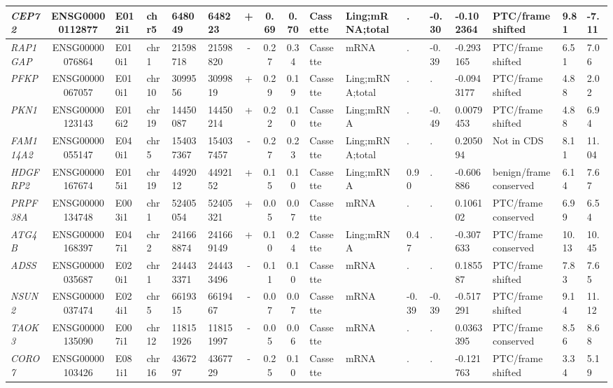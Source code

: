 \begin{appendices}
\begin{landscape}
\begin{table}
{\begin{tabular}{|l|c|l|l|l|l|c|c|c|l|l|l|l|l|l|l|l|}
\textit{CEP72} & ENSG00000112877 & E012i1 & chr5  & 648049 & 648223 & +     & 0.69  & 0.70  & Cassette & Ling;mRNA;total & . & -0.30 & -0.102364 & PTC/frame shifted & 9.81  &  -7.11 \\ \hline
\textit{RAP1GAP} & ENSG00000076864 & E010i1 & chr1  & 21598718 & 21598820 & -     & 0.27  & 0.34  & Cassette & mRNA  & . & -0.39 & -0.293165 & PTC/frame shifted & 6.51  &  7.06 \\ \hline
\textit{PFKP} & ENSG00000067057 & E010i1 & chr10 & 3099556 & 3099819 & +     & 0.29  & 0.19  & Cassette & Ling;mRNA;total & . & . & -0.0943177 & PTC/frame shifted & 4.88  &  2.02 \\ \hline
\textit{PKN1} & ENSG00000123143 & E016i2 & chr19 & 14450087 & 14450214 & +     & 0.22  & 0.10  & Cassette & Ling;mRNA & . & -0.49 & 0.0079453 & PTC/frame shifted & 4.88  &  6.94 \\ \hline
\textit{FAM114A2} & ENSG00000055147 & E040i1 & chr5  & 154037367 & 154037457 & -     & 0.27  & 0.23  & Cassette & Ling;mRNA;total & . & . & 0.205094 & Not in CDS & 8.11  &  11.04 \\ \hline
\textit{HDGFRP2} & ENSG00000167674 & E015i1 & chr19 & 4492012 & 4492152 & +     & 0.15  & 0.10  & Cassette & Ling;mRNA & 0.90  & . & -0.606886 & benign/frame conserved & 6.14  &  7.67 \\ \hline
\textit{PRPF38A} & ENSG00000134748 & E003i1 & chr1  & 52405054 & 52405321 & +     & 0.05  & 0.07  & Cassette & mRNA  & . & . & 0.106102 & PTC/frame conserved & 6.99  &  6.54 \\ \hline
\textit{ATG4B} & ENSG00000168397 & E047i1 & chr2  & 241668874 & 241669149 & +     & 0.10  & 0.24  & Cassette & Ling;mRNA & 0.47  & . & -0.307633 & PTC/frame conserved & 10.13 &  10.45 \\ \hline
\textit{ADSS} & ENSG00000035687 & E020i1 & chr1  & 244433371 & 244433496 & -     & 0.11  & 0.10  & Cassette & mRNA  & . & . & 0.185587 & PTC/frame shifted & 7.83  &  7.65 \\ \hline
\textit{NSUN2} & ENSG00000037474 & E024i1 & chr5  & 6619315 & 6619467 & -     & 0.07  & 0.07  & Cassette & mRNA  & -0.39 & -0.39 & -0.517291 & PTC/frame shifted & 9.14  &  11.12 \\ \hline		
		\textit{TAOK3} & ENSG00000135090 & E007i1 & chr12 & 118151926 & 118151997 & -     & 0.05  & 0.06  & Cassette & mRNA  & . & . & 0.0363395 & PTC/frame conserved & 8.56  &  8.68 \\ \hline
		\textit{CORO7} & ENSG00000103426 & E081i1 & chr16 & 4367297 & 4367729 & -     & 0.25  & 0.10  & Cassette & mRNA  & . & . & -0.121763 & PTC/frame shifted & 3.34  &  5.19 \\ \hline

\end{tabular}}
\end{table}
\end{landscape}
\end{appendices}
